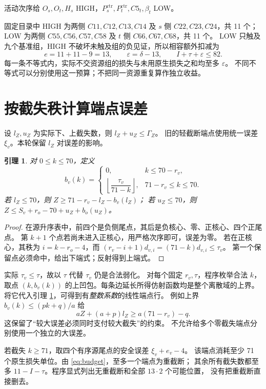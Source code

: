 \documentclass[11pt,a4paper]{article}
\newtheorem{lemma}[theorem]{引理}
\begin{document}
活动次序给 $O_s,O_t,H_s$ HIGH，$P_s^{\mathrm{ctr}},P_t^{\mathrm{ctr}},C5_t,\beta_t$ LOW。

固定目录中 HIGH 为两侧 $C11,C12,C13,C14$ 及 $s$ 侧 $C22,C23,C24$，共 11 个；
LOW 为两侧 $C55,C56,C57,C58$ 及 $t$ 侧 $C66,C67,C68$，共 11 个。
LOW 只触及九个基准组，HIGH 不破坏未触及组的负见证，所以相容额外扣减为
\begin{equation}
 e=11+11-9=13,\qquad\varepsilon=\delta-13,\qquad
 I+\tau+\varepsilon\le82.\label{eq:budget}
\end{equation}
每一条不等式内，实际不交资源组的损失与未用原生损失之和均至多 $\varepsilon$。
不同不等式可以分别使用这一预算；不把同一资源重复算作独立收益。

\section{按截失秩计算端点误差}
设 $l_Z,u_Z$ 为实际下、上截失数，则 $l_Z+u_Z\le\Gamma_Z$。
旧的轻截断端点使用统一误差 $\xi_v$。本轮保留 $l_Z$ 对误差的影响。
\begin{lemma}\label{lem:rank}
对 $0\le k\le70$，定义
\[
 b_v(k)=\begin{cases}
 0,&k\le70-r_v,\\
 \left\lfloor\dfrac{\tau_v}{71-k}\right\rfloor,&71-r_v\le k\le70.
 \end{cases}
\]
若 $l_Z\le70$，则 $Z\ge71-r_v-l_Z-b_v(l_Z)$；
若 $u_Z\le70$，则 $Z\le S_v+r_o-70+u_Z+b_o(u_Z)$。
\end{lemma}
\begin{proof}
在源升序表中，前四个是负侧尾点，其后是负核心、零、正核心、四个正尾点。
第 $k+1$ 个点若尚未进入正核心，用严格次序即可，误差为零。
若在正核心，其秩为 $i=k-r_o-4$，而
$(r_v-i+1)d_{v,i}=(71-k)d_{v,i}\le\tau_v$。
第一个保留点必须命中，给出下端式；反射得到上端式。
\end{proof}
实际 $\tau_v\le\tau$，故以 $\tau$ 代替 $\tau_v$ 仍是合法弱化。
对每个固定 $r_v,\tau$，程序枚举合法 $k$，取点
$(k,b_v(k))$ 的上凹包。每条边延长所得仿射函数均是整个离散域的上界。
将它代入引理 \ref{lem:rank}，可得到有\emph{整数系数}的线性端点行。
例如上界 $b_v(k)\le(pk+q)/a$ 给
\[
 aZ+(a+p)l_Z\ge a(71-r_v)-q.
\]
这保留了“较大误差必须同时支付较大截失”的约束。
不允许给多个零截失端点分别使用一个独立的大误差。

若截失 $k\ge71$，取四个有序源尾点的安全误差 $\xi_v+e_v-4$。
该端点消耗至少 71 个原生损失单位。由 \eqref{eq:budget}，至多一个端点为重截断；
其余所有截失数都至多 $11-I-\tau$。程序显式列出无重截断和全部 $13\cdot2$ 个可能位置，
没有把重截断直接删去。
\end{document}
